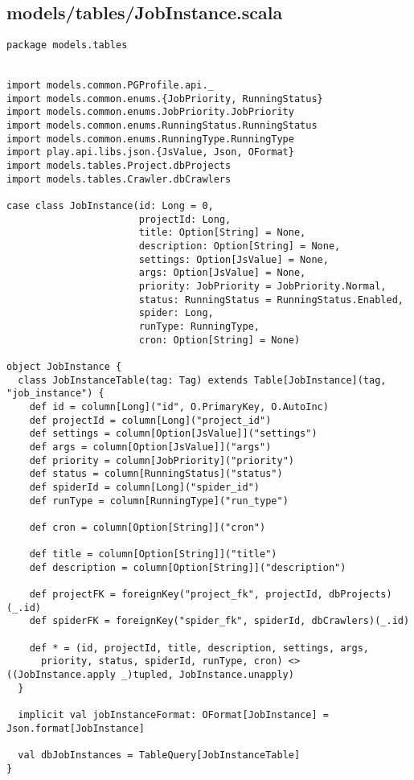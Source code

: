 \subsection{models/tables/JobInstance.scala}
\begin{lstlisting}
package models.tables


import models.common.PGProfile.api._
import models.common.enums.{JobPriority, RunningStatus}
import models.common.enums.JobPriority.JobPriority
import models.common.enums.RunningStatus.RunningStatus
import models.common.enums.RunningType.RunningType
import play.api.libs.json.{JsValue, Json, OFormat}
import models.tables.Project.dbProjects
import models.tables.Crawler.dbCrawlers

case class JobInstance(id: Long = 0,
                       projectId: Long,
                       title: Option[String] = None,
                       description: Option[String] = None,
                       settings: Option[JsValue] = None,
                       args: Option[JsValue] = None,
                       priority: JobPriority = JobPriority.Normal,
                       status: RunningStatus = RunningStatus.Enabled,
                       spider: Long,
                       runType: RunningType,
                       cron: Option[String] = None)

object JobInstance {
  class JobInstanceTable(tag: Tag) extends Table[JobInstance](tag, "job_instance") {
    def id = column[Long]("id", O.PrimaryKey, O.AutoInc)
    def projectId = column[Long]("project_id")
    def settings = column[Option[JsValue]]("settings")
    def args = column[Option[JsValue]]("args")
    def priority = column[JobPriority]("priority")
    def status = column[RunningStatus]("status")
    def spiderId = column[Long]("spider_id")
    def runType = column[RunningType]("run_type")

    def cron = column[Option[String]]("cron")

    def title = column[Option[String]]("title")
    def description = column[Option[String]]("description")

    def projectFK = foreignKey("project_fk", projectId, dbProjects)(_.id)
    def spiderFK = foreignKey("spider_fk", spiderId, dbCrawlers)(_.id)

    def * = (id, projectId, title, description, settings, args,
      priority, status, spiderId, runType, cron) <> ((JobInstance.apply _)tupled, JobInstance.unapply)
  }

  implicit val jobInstanceFormat: OFormat[JobInstance] = Json.format[JobInstance]

  val dbJobInstances = TableQuery[JobInstanceTable]
}
\end{lstlisting}
